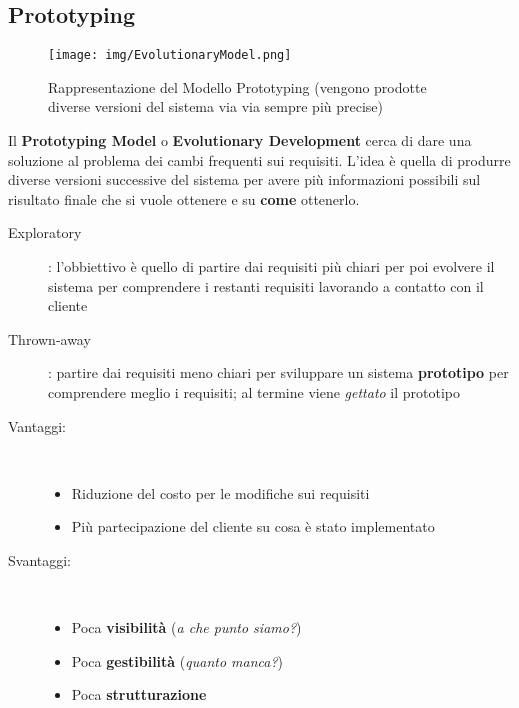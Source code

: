 \subsection{Prototyping}

\begin{figure}[H]
    \centering
    \texttt{[image: img/EvolutionaryModel.png]}
    \caption*{Rappresentazione del Modello Prototyping (vengono
                prodotte diverse versioni del sistema via via
                sempre pi\`u precise)}
\end{figure}

Il \textbf{Prototyping Model} o \textbf{Evolutionary Development}
cerca di dare una soluzione al problema dei cambi frequenti
sui requisiti. L'idea \`e quella di produrre diverse versioni
successive del sistema per avere pi\`u informazioni possibili
sul risultato finale che si vuole ottenere e su \textbf{come} ottenerlo.

\begin{description}
    \item[Exploratory]: l'obbiettivo \`e quello di partire dai
                requisiti pi\`u chiari per poi evolvere il sistema
                per comprendere i restanti requisiti lavorando a
                contatto con il cliente
    \item[Thrown-away]: partire dai requisiti meno chiari per
                sviluppare un sistema \textbf{prototipo} per comprendere
                meglio i requisiti; al termine viene \textit{gettato}
                il prototipo 
\end{description}

\begin{description}
    \item[Vantaggi:]\ 
        \begin{itemize}
            \item Riduzione del costo per le modifiche sui requisiti
            \item Pi\`u partecipazione del cliente su cosa \`e stato
                    implementato
        \end{itemize}
    \item[Svantaggi:]\ 
        \begin{itemize}
            \item Poca \textbf{visibilit\`a} (\textit{a che punto siamo?})
            \item Poca \textbf{gestibilit\`a} (\textit{quanto manca?})
            \item Poca \textbf{strutturazione}
        \end{itemize}
\end{description} 

